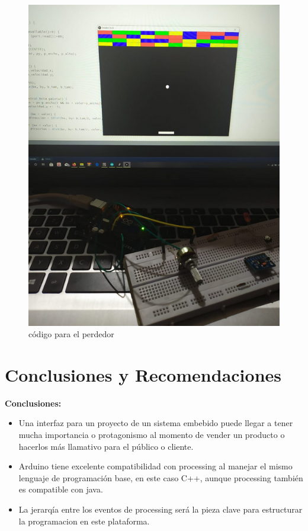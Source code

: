 \documentclass[10pt,a4paper]{article}
\begin{document}
\begin{figure}[H]
\centering
\includegraphics[scale=0.3]{funcio.PNG}
\caption{código para el perdedor}
\end{figure}

\section{Conclusiones y Recomendaciones}

\textbf{Conclusiones:}
\begin{itemize}
\renewcommand{\labelitemi}{$*$}
\item Una interfaz para un proyecto de un sistema embebido puede llegar a tener mucha importancia o protagonismo al momento de vender un producto o hacerlos más llamativo para el público o cliente.
\item Arduino tiene excelente compatibilidad con processing al manejar el mismo lenguaje de programación base, en este caso C++, aunque processing también es compatible con java.
\item La jerarqía entre los eventos de processing será la pieza clave para estructurar la programacion en este plataforma.
\end{itemize}
\end{document}
